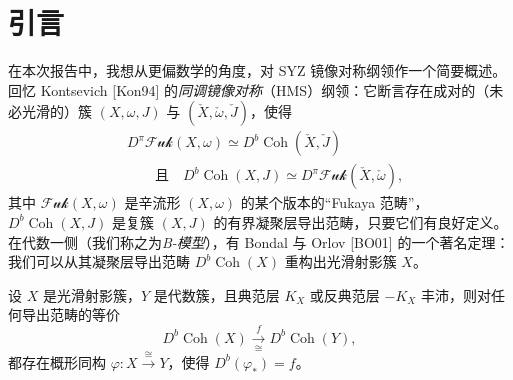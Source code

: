 
\section{引言}

在本次报告中，我想从更偏数学的角度，对 SYZ 镜像对称纲领作一个简要概述。回忆 Kontsevich [Kon94] 的\emph{同调镜像对称}（HMS）纲领：它断言存在成对的（未必光滑的）簇 $(X,\omega,J)$ 与 $(\check{X},\check{\omega},\check{J})$，使得
\begin{align*}
  &D^{\pi}\mathcal{Fuk}(X,\omega)\simeq D^b\operatorname{Coh}(\check{X},\check{J})\\
  &\qquad\text{且}\quad D^b\operatorname{Coh}(X,J)\simeq D^{\pi}\mathcal{Fuk}(\check{X},\check{\omega}),
\end{align*}
其中 $\mathcal{Fuk}(X,\omega)$ 是辛流形 $(X,\omega)$ 的某个版本的“Fukaya 范畴”，$D^b\operatorname{Coh}(X,J)$ 是复簇 $(X,J)$ 的有界凝聚层导出范畴，只要它们有良好定义。在代数一侧（我们称之为\emph{B-模型}），有 Bondal 与 Orlov [BO01] 的一个著名定理：我们可以从其凝聚层导出范畴 $D^b\operatorname{Coh}(X)$ 重构出光滑射影簇 $X$。


\begin{theorem*}
设 $X$ 是光滑射影簇，$Y$ 是代数簇，且典范层 $K_X$ 或反典范层 $-K_X$ 丰沛，则对任何导出范畴的等价
\[
  D^b\operatorname{Coh}(X)\xrightarrow[\cong]{f}D^b\operatorname{Coh}(Y),
\]
都存在概形同构 $\varphi\colon X\xrightarrow{\cong}Y$，使得 $D^b(\varphi_{\ast})=f$。
\end{theorem*}


